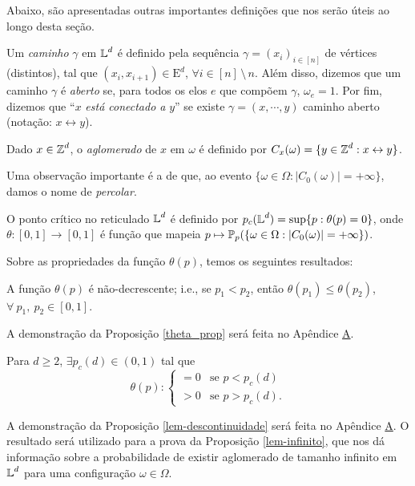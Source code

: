 \par Abaixo, são apresentadas outras importantes definições que nos serão úteis ao longo desta seção.

\begin{mydef} \label{caminho}
	Um \textit{caminho} $\gamma$ em $\operatorname{\mathbb{L}}^d$ é definido pela sequência $\gamma = (x_i)_{i \in [n]}$ de vértices (distintos), tal que $(x_i, x_{i + 1}) \in \text{E}^d$, $\forall i \in [n] \,\text{\textbackslash}\, n$. Além disso, dizemos que um caminho $\gamma$ é \textit{aberto} se, para todos os elos $e$ que compõem $\gamma$, $\omega_e = 1$. Por fim, dizemos que ``$x$ \textit{está conectado a} $y$'' se existe $\gamma = (x, \cdots, y)$ caminho aberto (notação: $x \leftrightarrow y$).
\end{mydef}

\begin{mydef} \label{aglomerado}
	Dado $x \in \operatorname{\mathbb{Z}}^d$, o \textit{aglomerado} de $x$ em $\omega$ é definido por $C_x(\omega) = \{y \in \operatorname{\mathbb{Z}}^d: x \leftrightarrow y\}$.
\end{mydef}

Uma observação importante é a de que, ao evento $\{\omega \in \Omega: |C_0(\omega)| = +\infty\}$, damos o nome de \textit{percolar}.

\begin{mydef}
	O ponto crítico no reticulado $\operatorname{\mathbb{L}}^d$ é definido por $p_c(\operatorname{\mathbb{L}}^d) = \sup\{p: \theta(p) = 0\}$, onde $\theta: [0, 1] \longrightarrow [0, 1]$ é função que mapeia $p \mapsto \operatorname{\mathbb{P}}_p(\{\omega \in \Omega : |C_0(\omega)| = +\infty\})$.
\end{mydef}

\par Sobre as propriedades da função $\theta(p)$, temos os seguintes resultados:

\begin{mypro} \label{theta_prop}
	A função $\theta(p)$ é não-decrescente; i.e., se $p_1 < p_2$, então $\theta(p_1) \leq \theta(p_2)$, $\forall ~p_1, ~p_2 \in [0, 1]$.
\end{mypro}

\par A demonstração da Proposição \ref{theta_prop} será feita no Apêndice \hyperref[apendice-primeiro]{A}.

\begin{mypro} \label{lem-descontinuidade}
	Para $d \geq 2$, $\exists p_c(d) \in (0, 1)$ tal que
	\[ \theta(p) : \begin{cases}
	= 0 & \text{se } p < p_c(d) \\
	> 0 & \text{se } p > p_c(d).
	\end{cases}
	\]
\end{mypro}
\par A demonstração da Proposição \ref{lem-descontinuidade} será feita no Apêndice \hyperref[apendice-primeiro]{A}. O resultado será utilizado para a prova da Proposição \ref{lem-infinito}, que nos dá informação sobre a probabilidade de existir aglomerado de tamanho infinito em $\operatorname{\mathbb{L}}^d$ para uma configuração $\omega \in \Omega$.

